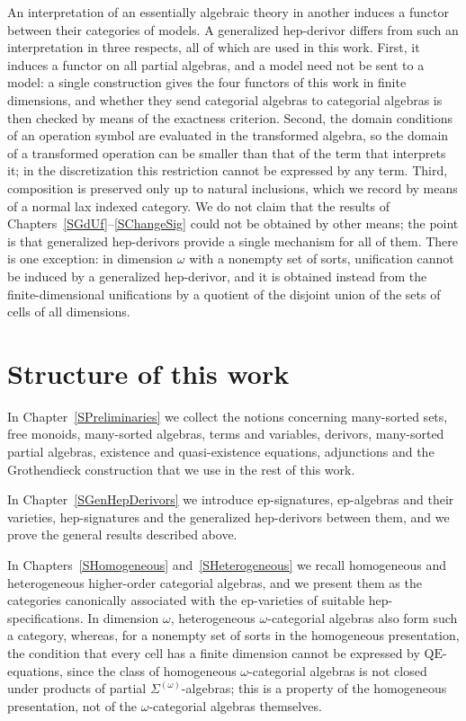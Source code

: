 \documentclass[a4paper, reqno]{amsbook}
\newcommand{\QE}{\mathrm{QE}}
\theoremstyle{plain}
\theoremstyle{definition}
\begin{document}
An interpretation of an essentially algebraic theory in another induces a functor between their categories of models.
A generalized hep-derivor differs from such an interpretation in three respects, all of which are used in this work.
First, it induces a functor on all partial algebras, and a model need not be sent to a model: a single construction gives the four functors of this work in finite dimensions, and whether they send categorial algebras to categorial algebras is then checked by means of the exactness criterion.
Second, the domain conditions of an operation symbol are evaluated in the transformed algebra, so the domain of a transformed operation can be smaller than that of the term that interprets it; in the discretization this restriction cannot be expressed by any term.
Third, composition is preserved only up to natural inclusions, which we record by means of a normal lax indexed category.
We do not claim that the results of Chapters~\ref{SGdUf}--\ref{SChangeSig} could not be obtained by other means; the point is that generalized hep-derivors provide a single mechanism for all of them. There is one exception: in dimension $\omega$ with a nonempty set of sorts, unification cannot be induced by a generalized hep-derivor, and it is obtained instead from the finite-dimensional unifications by a quotient of the disjoint union of the sets of cells of all dimensions.

\section{Structure of this work}

In Chapter~\ref{SPreliminaries} we collect the notions concerning many-sorted sets, free monoids, many-sorted algebras, terms and variables, derivors, many-sorted partial algebras, existence and quasi-existence equations, adjunctions and the Grothendieck construction that we use in the rest of this work.

In Chapter~\ref{SGenHepDerivors} we introduce ep-signatures, ep-algebras and their varieties, hep-signatures and the generalized hep-derivors between them, and we prove the general results described above.

In Chapters~\ref{SHomogeneous} and~\ref{SHeterogeneous} we recall homogeneous and heterogeneous higher-order categorial algebras, and we present them as the categories canonically associated with the ep-varieties of suitable hep-specifications.
In dimension $\omega$, heterogeneous $\omega$-categorial algebras also form such a category, whereas, for a nonempty set of sorts in the homogeneous presentation, the condition that every cell has a finite dimension cannot be expressed by $\QE$-equations, since the class of homogeneous $\omega$-categorial algebras is not closed under products of partial $\Sigma^{(\omega)}$-algebras; this is a property of the homogeneous presentation, not of the $\omega$-categorial algebras themselves.
\end{document}

